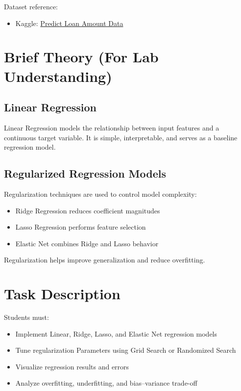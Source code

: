 \documentclass[11pt]{article}
\begin{document}
Dataset reference:
\begin{itemize}
    \item Kaggle: \href{https://www.kaggle.com/datasets/phileinsophos/predict-loan-amount-data}{Predict Loan Amount Data}
\end{itemize}

\section*{Brief Theory (For Lab Understanding)}

\subsection*{Linear Regression}
Linear Regression models the relationship between input features and a continuous target variable.
It is simple, interpretable, and serves as a baseline regression model.

\subsection*{Regularized Regression Models}
Regularization techniques are used to control model complexity:
\begin{itemize}
    \item Ridge Regression reduces coefficient magnitudes
    \item Lasso Regression performs feature selection
    \item Elastic Net combines Ridge and Lasso behavior
\end{itemize}

Regularization helps improve generalization and reduce overfitting.

\section*{Task Description}
Students must:
\begin{itemize}
    \item Implement Linear, Ridge, Lasso, and Elastic Net regression models
    \item Tune regularization Parameters using Grid Search or Randomized Search
    \item Visualize regression results and errors
    \item Analyze overfitting, underfitting, and bias--variance trade-off
\end{itemize}
\end{document}
